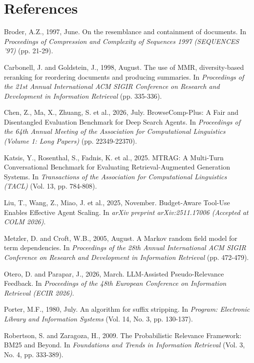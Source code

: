 \documentclass[conference]{IEEEtran}
\begin{document}
\section*{References}
\begingroup
\small
\setlength{\smallskipamount}{1pt}
\noindent Broder, A.Z., 1997, June. On the resemblance and containment of documents. In \textit{Proceedings of Compression and Complexity of Sequences 1997 (SEQUENCES '97)} (pp. 21-29).\smallskip

\noindent Carbonell, J. and Goldstein, J., 1998, August. The use of MMR, diversity-based reranking for reordering documents and producing summaries. In \textit{Proceedings of the 21st Annual International ACM SIGIR Conference on Research and Development in Information Retrieval} (pp. 335-336).\smallskip

\noindent Chen, Z., Ma, X., Zhuang, S. et al., 2026, July. BrowseComp-Plus: A Fair and Disentangled Evaluation Benchmark for Deep Search Agents. In \textit{Proceedings of the 64th Annual Meeting of the Association for Computational Linguistics (Volume 1: Long Papers)} (pp. 22349-22370).\smallskip

\noindent Katsis, Y., Rosenthal, S., Fadnis, K. et al., 2025. MTRAG: A Multi-Turn Conversational Benchmark for Evaluating Retrieval-Augmented Generation Systems. In \textit{Transactions of the Association for Computational Linguistics (TACL)} (Vol. 13, pp. 784-808).\smallskip

\noindent Liu, T., Wang, Z., Miao, J. et al., 2025, November. Budget-Aware Tool-Use Enables Effective Agent Scaling. In \textit{arXiv preprint arXiv:2511.17006 (Accepted at COLM 2026)}.\smallskip

\noindent Metzler, D. and Croft, W.B., 2005, August. A Markov random field model for term dependencies. In \textit{Proceedings of the 28th Annual International ACM SIGIR Conference on Research and Development in Information Retrieval} (pp. 472-479).\smallskip

\noindent Otero, D. and Parapar, J., 2026, March. LLM-Assisted Pseudo-Relevance Feedback. In \textit{Proceedings of the 48th European Conference on Information Retrieval (ECIR 2026)}.\smallskip

\noindent Porter, M.F., 1980, July. An algorithm for suffix stripping. In \textit{Program: Electronic Library and Information Systems} (Vol. 14, No. 3, pp. 130-137).\smallskip

\noindent Robertson, S. and Zaragoza, H., 2009. The Probabilistic Relevance Framework: BM25 and Beyond. In \textit{Foundations and Trends in Information Retrieval} (Vol. 3, No. 4, pp. 333-389).\smallskip
\end{document}
